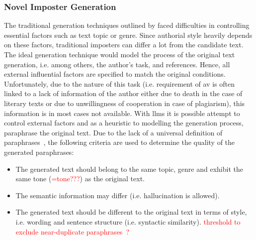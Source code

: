 \subsubsection{Novel Imposter Generation}
\label{subsubsec:novel_imposter_generation}
The traditional generation techniques outlined by \citet{koppel_determining_2014} faced difficulties in controlling essential factors such as text topic or genre.
Since authorial style heavily depends on these factors, traditional imposters can differ a lot from the candidate text.
The ideal generation technique would model the process of the original text generation, 
i.e. among others, the author's task, and references.
Hence, all external influential factors are specified to match the original conditions.
Unfortunately, due to the nature of this task 
(i.e. requirement of \ac{av} is often linked to a lack of information of the author either due to death in the case of literary texts or 
due to unwillingness of cooperation in case of plagiarism), this information is in most cases not available.
With \acp{llm} it is possible attempt to control external factors and 
as a heuristic to modelling the generation process, paraphrase the original text.
Due to the lack of a universal definition of paraphrases~\citep{gohsen_task_oriented_2024}, the following criteria are used to determine the quality of the generated paraphrases:
\begin{itemize}
    \item The generated text should belong to the same topic, genre and exhibit the same tone (\textcolor{red}{=tone???}) as the original text.
    \item The semantic information may differ (i.e. hallucination is allowed).
    \item The generated text should be different to the original text in terms of style, i.e. wording and sentence structure (i.e. syntactic similarity). \textcolor{red}{threshold to exclude near-duplicate paraphrases~\citep{gohsen_captions_2023}?}
\end{itemize}

